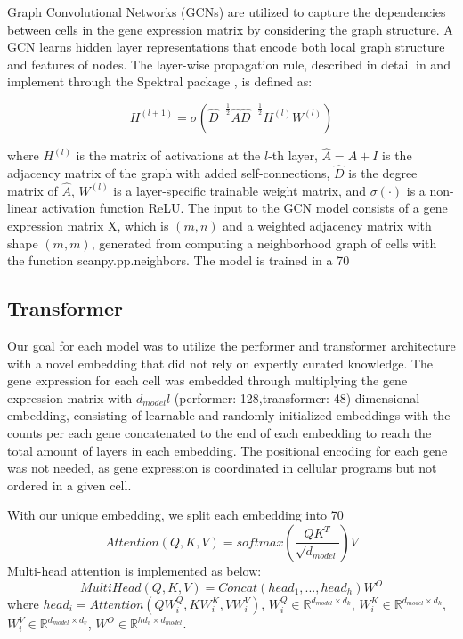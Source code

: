 \documentclass{article}
\begin{document}
Graph Convolutional Networks (GCNs) are utilized to capture the dependencies between cells in the gene expression matrix by considering the graph structure. A GCN learns hidden layer representations that encode both local graph structure and features of nodes. The layer-wise propagation rule, described in detail in \cite{kipfSemiSupervisedClassificationGraph2017} and implement through the Spektral package \cite{grattarolaGraphNeuralNetworks2020}, is defined as:
 
$$
H^{(l+1)} = \sigma(\hat{D}^{-\frac{1}{2}} \hat{A} \hat{D}^{-\frac{1}{2}} H^{(l)} W^{(l)})
$$
 
where $H^{(l)}$ is the matrix of activations at the $l$-th layer, $\hat{A} = A + I$ is the adjacency matrix of the graph with added self-connections, $\hat{D}$ is the degree matrix of $\hat{A}$, $W^{(l)}$ is a layer-specific trainable weight matrix, and $\sigma(\cdot)$ is a non-linear activation function ReLU. The input to the GCN model consists of a gene expression matrix X, which is $(m, n)$ and a weighted adjacency matrix with shape $(m, m)$, generated from computing a neighborhood graph of cells with the function scanpy.pp.neighbors. The model is trained in a 70%


\subsection{Transformer}

Our goal for each model was to utilize the performer and transformer architecture with a novel embedding that did not rely on expertly curated knowledge. The gene expression for each cell was embedded through multiplying the gene expression matrix with $d_{model}l$ (performer: 128,transformer: 48)-dimensional embedding, consisting of learnable and randomly initialized embeddings with the counts per each gene concatenated to the end of each embedding to reach the total amount of layers in each embedding. The positional encoding for each gene was not needed, as gene expression is coordinated in cellular programs but not ordered in a given cell.

With our unique embedding, we split each embedding into 70%
$$
Attention(Q,K,V) = softmax(\frac{QK^T}{\sqrt{d_{model}}})V
$$
Multi-head attention is implemented as below:
$$
MultiHead(Q,K,V) = Concat(head_1,...,head_h)W^O
$$
where $head_i = Attention(QW_i^Q,KW_i^K,VW_i^V)$, $W_i^Q \in \mathbb{R}^{d_{model} \times d_k}$, $W_i^K \in \mathbb{R}^{d_{model} \times d_k}$, $W_i^V \in \mathbb{R}^{d_{model} \times d_v}$, $W^O \in \mathbb{R}^{hd_v \times d_{model}}$.
\end{document}
